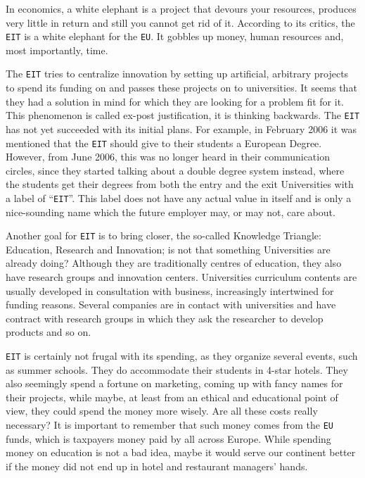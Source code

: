 \documentclass[11pt,a4paper,oneside,twocolumn]{IEEEtran}
\begin{document}
In economics, a white elephant is a project that devours your resources, produces very little in return and still you cannot get rid of it. According to its critics, the \texttt{EIT} is a white elephant for the \texttt{EU}. It gobbles up money, human resources and, most importantly, time.

The \texttt{EIT} tries to centralize innovation by setting up artificial, arbitrary projects to spend its funding on and passes these projects on to universities. It seems that they had a solution in mind for which they are looking for a problem fit for it. This phenomenon is called ex-post justification, it is thinking backwards. The \texttt{EIT} has not yet succeeded with its initial plans. For example, in February 2006 it was mentioned that the \texttt{EIT} should give to their students a European Degree\cite{5_4}. However, from June 2006, this was no longer heard in their communication circles, since they started talking about a double degree system instead, where the students get their degrees from both the entry and the exit Universities with a label of ``\texttt{EIT}''\cite{5_3}. This label does not have any actual value in itself and is only a nice-sounding name which the future employer may, or may not, care about.

Another goal for \texttt{EIT} is to bring closer, the so-called Knowledge Triangle: Education, Research and Innovation; is not that something Universities are already doing? Although they are traditionally centres of education, they also have research groups and innovation centers. Universities curriculum contents are usually developed in consultation with business, increasingly intertwined for funding reasons. Several companies are in contact with universities and have contract with research groups in which they ask the researcher to develop products and so on.

\texttt{EIT} is certainly not frugal with its spending, as they organize several events, such as summer schools. They do accommodate their students in 4-star hotels. They also seemingly spend a fortune on marketing, coming up with fancy names for their projects, while maybe, at least from an ethical and educational point of view, they could spend the money more wisely. Are all these costs really necessary? It is important to remember that such money comes from the \texttt{EU} funds, which is taxpayers money paid by all across Europe. While spending money on education is not a bad idea, maybe it would serve our continent better if the money did not end up in hotel and restaurant managers' hands.
\end{document}
